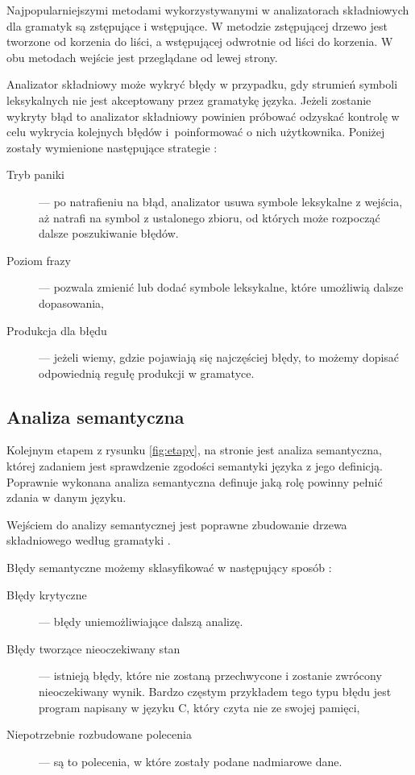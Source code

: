 Najpopularniejszymi metodami wykorzystywanymi w analizatorach składniowych
 dla gramatyk są zstępujące i wstępujące.
W metodzie zstępującej drzewo jest tworzone od korzenia do liści,
 a wstępującej odwrotnie od liści do korzenia.
W obu metodach wejście jest przeglądane od lewej strony.

Analizator składniowy może wykryć błędy w przypadku,
 gdy strumień symboli leksykalnych nie jest akceptowany przez gramatykę języka.
Jeżeli zostanie wykryty błąd to analizator składniowy powinien próbować odzyskać kontrolę w celu wykrycia kolejnych błędów
 i~poinformować o nich użytkownika.
Poniżej zostały  wymienione następujące strategie \cite{aho}:
\begin{description}
  \item[Tryb paniki] --- 
     po natrafieniu na błąd,
     analizator usuwa symbole leksykalne z wejścia, 
     aż natrafi na symbol z ustalonego zbioru,
     od których może rozpocząć dalsze poszukiwanie błędów.
  \item[Poziom frazy] --- 
      pozwala zmienić lub dodać symbole leksykalne,
      które umożliwią dalsze dopasowania,
  \item [Produkcja dla błędu] --- 
     jeżeli wiemy, 
     gdzie pojawiają się najczęściej błędy,
     to możemy dopisać odpowiednią regułę produkcji w gramatyce.
\end{description}

\subsection{Analiza semantyczna} \label{p_semantyczna}
Kolejnym etapem z rysunku \ref{fig:etapy}, na stronie \pageref{fig:etapy} jest analiza semantyczna, 
której zadaniem jest sprawdzenie zgodości semantyki języka z jego definicją. Poprawnie wykonana 
analiza semantyczna definuje jaką rolę powinny pełnić zdania w danym języku.

Wejściem do analizy semantycznej jest poprawne zbudowanie drzewa składniowego według gramatyki \cite{aho}.

Błędy semantyczne możemy sklasyfikować w następujący sposób \cite{link_semantic}:
\begin{description}
 \item[Błędy krytyczne] ---
    błędy uniemożliwiające dalszą analizę. 
 \item[Błędy tworzące nieoczekiwany stan] --- 
    istnieją błędy, które nie zostaną przechwycone i zostanie zwrócony nieoczekiwany wynik.
   Bardzo częstym przykładem tego typu błędu jest program napisany w języku C,
    który czyta nie ze swojej pamięci,
 \item[Niepotrzebnie rozbudowane polecenia] --- są to polecenia, w które zostały podane nadmiarowe dane.
\end{description}


\begin{comment} 
\end{comment}